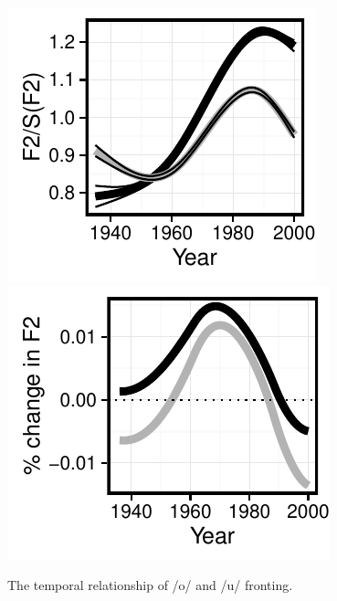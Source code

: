 \documentclass[12pt]{article}
\begin{document}
\begin{figure}
\centering
\includegraphics{owuwparallel.pdf}
\includegraphics{owuwparallelROC.pdf}
\caption{The temporal relationship of /o/ and /u/ fronting.}
\end{figure}
\end{document}
